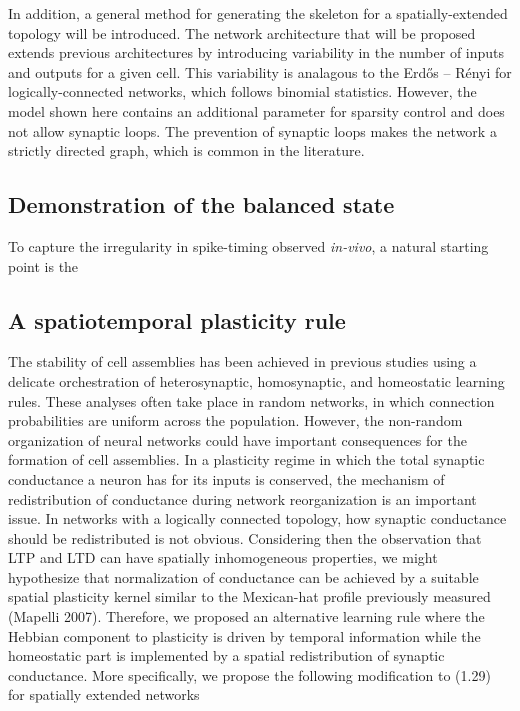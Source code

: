 \documentclass{ucetd}
\begin{document}
 In addition, a general method for generating the skeleton for a spatially-extended topology will be introduced. The network architecture that will be proposed extends previous architectures by introducing variability in the number of inputs and outputs for a given cell. This variability is analagous to the Erdős – Rényi for logically-connected networks, which follows binomial statistics. However, the model shown here contains an additional parameter for sparsity control and does not allow synaptic loops. The prevention of synaptic loops makes the network a strictly directed graph, which is common in the literature.

\subsection{Demonstration of the balanced state}

To capture the irregularity in spike-timing observed \emph{in-vivo}, a natural starting point is the 


\subsection{A spatiotemporal plasticity rule}

The stability of cell assemblies has been achieved in previous studies using a delicate orchestration of heterosynaptic, homosynaptic, and homeostatic learning rules. These analyses often take place in random networks, in which connection probabilities are uniform across the population. However, the non-random organization of neural networks could have important consequences for the formation of cell assemblies. In a plasticity regime in which the total synaptic conductance a neuron has for its inputs is conserved, the mechanism of redistribution of conductance during network reorganization is an important issue. In networks with a logically connected topology, how synaptic conductance should be redistributed is not obvious. Considering then the observation that LTP and LTD can have spatially inhomogeneous properties, we might hypothesize that normalization of conductance can be achieved by a suitable spatial plasticity kernel similar to the Mexican-hat profile previously measured (Mapelli 2007). Therefore, we proposed an alternative learning rule where the Hebbian component to plasticity is driven by temporal information while the homeostatic part is implemented by a spatial redistribution of synaptic conductance. More specifically, we propose the following modification to (1.29) for spatially extended networks
\end{document}
